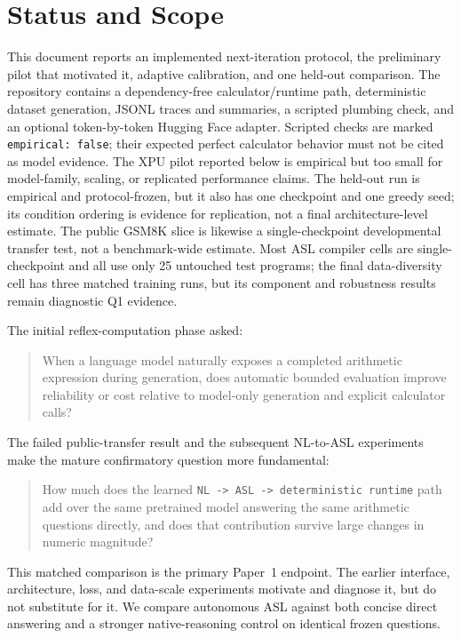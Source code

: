 \documentclass[11pt]{article}
\begin{document}
\section{Status and Scope}

This document reports an implemented next-iteration protocol, the preliminary
pilot that motivated it, adaptive calibration, and one held-out comparison.
The repository contains a dependency-free calculator/runtime path, deterministic
dataset generation, JSONL traces and summaries, a scripted plumbing check, and
an optional token-by-token Hugging Face adapter. Scripted checks are marked
\texttt{empirical: false}; their expected perfect calculator behavior must not
be cited as model evidence. The XPU pilot reported below is empirical but too
small for model-family, scaling, or replicated performance claims. The held-out
run is empirical and protocol-frozen, but it also has one checkpoint and one
greedy seed; its condition ordering is evidence for replication, not a final
architecture-level estimate. The public GSM8K slice is likewise a
single-checkpoint developmental transfer test, not a benchmark-wide estimate.
Most ASL compiler cells are single-checkpoint and all use only 25 untouched test
programs; the final data-diversity cell has three matched training runs, but its
component and robustness results remain diagnostic Q1 evidence.

The initial reflex-computation phase asked:
\begin{quote}
When a language model naturally exposes a completed arithmetic expression
during generation, does automatic bounded evaluation improve reliability or
cost relative to model-only generation and explicit calculator calls?
\end{quote}

The failed public-transfer result and the subsequent NL-to-ASL experiments make
the mature confirmatory question more fundamental:
\begin{quote}
How much does the learned \texttt{NL -> ASL -> deterministic runtime} path add
over the same pretrained model answering the same arithmetic questions directly,
and does that contribution survive large changes in numeric magnitude?
\end{quote}
This matched comparison is the primary Paper~1 endpoint. The earlier interface,
architecture, loss, and data-scale experiments motivate and diagnose it, but do
not substitute for it. We compare autonomous ASL against both concise direct
answering and a stronger native-reasoning control on identical frozen questions.
\end{document}
